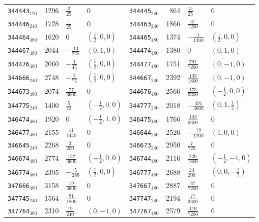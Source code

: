 {\begin{longtable}{@{}lrll@{\hspace{2em}}lrll@{}}
\texttt{344443}$_{120}$ & 1296 & $\tfrac{2}{25}$ & 0 & \texttt{344445}$_{240}$ & 864 & $\tfrac{3}{25}$ & 0\\
\texttt{344446}$_{240}$ & 1728 & $\tfrac{1}{25}$ & 0 & \texttt{344463}$_{240}$ & 1866 & $\tfrac{31}{1200}$ & 0\\
\texttt{344464}$_{480}$ & 1620 & $0$ & $(\tfrac{1}{2},0,0)$ & \texttt{344465}$_{480}$ & 1374 & $-\tfrac{1}{1200}$ & $(\tfrac{1}{2},0,0)$\\
\texttt{344467}$_{480}$ & 2044 & $-\tfrac{13}{225}$ & $(0,1,0)$ & \texttt{344474}$_{480}$ & 1380 & $0$ & $(0,1,0)$\\
\texttt{344476}$_{480}$ & 2060 & $-\tfrac{1}{45}$ & $(\tfrac{1}{2},0,0)$ & \texttt{344477}$_{480}$ & 1751 & $\tfrac{791}{7200}$ & $(0,-1,0)$\\
\texttt{344666}$_{240}$ & 2748 & $-\tfrac{2}{75}$ & $(\tfrac{1}{2},0,0)$ & \texttt{344667}$_{240}$ & 2392 & $\tfrac{133}{1800}$ & $(0,-1,0)$\\
\texttt{344673}$_{480}$ & 2074 & $\tfrac{77}{3600}$ & 0 & \texttt{344676}$_{480}$ & 2566 & $\tfrac{173}{3600}$ & $(-\tfrac{1}{2},0,0)$\\
\texttt{344775}$_{240}$ & 1400 & $\tfrac{5}{72}$ & $(-\tfrac{1}{2},0,0)$ & \texttt{344777}$_{240}$ & 2018 & $-\tfrac{491}{3600}$ & $(0,1,\tfrac{1}{2})$\\
\texttt{346474}$_{480}$ & 1920 & $0$ & $(-\tfrac{1}{2},1,0)$ & \texttt{346475}$_{480}$ & 1766 & $\tfrac{103}{3600}$ & 0\\
\texttt{346477}$_{480}$ & 2155 & $\tfrac{11}{1440}$ & 0 & \texttt{346644}$_{240}$ & 2526 & $-\tfrac{79}{1200}$ & $(1,0,0)$\\
\texttt{346645}$_{240}$ & 2268 & $\tfrac{3}{200}$ & 0 & \texttt{346673}$_{240}$ & 2950 & $\tfrac{7}{720}$ & 0\\
\texttt{346674}$_{480}$ & 2774 & $\tfrac{157}{3600}$ & $(-\tfrac{1}{2},0,0)$ & \texttt{346744}$_{480}$ & 2116 & $\tfrac{229}{1800}$ & $(-\tfrac{1}{2},-1,0)$\\
\texttt{346774}$_{480}$ & 2395 & $-\tfrac{5}{288}$ & $(\tfrac{1}{2},0,0)$ & \texttt{346777}$_{480}$ & 2688 & $\tfrac{23}{200}$ & $(0,0,-\tfrac{1}{2})$\\
\texttt{347666}$_{480}$ & 3158 & $\tfrac{19}{3600}$ & 0 & \texttt{347667}$_{480}$ & 2887 & $\tfrac{67}{7200}$ & 0\\
\texttt{347745}$_{240}$ & 1564 & $\tfrac{91}{1800}$ & 0 & \texttt{347747}$_{240}$ & 2194 & $\tfrac{77}{3600}$ & 0\\
\texttt{347764}$_{480}$ & 2310 & $\tfrac{19}{240}$ & $(0,-1,0)$ & \texttt{347767}$_{480}$ & 2579 & $\tfrac{119}{7200}$ & 0\\

\end{longtable}}
